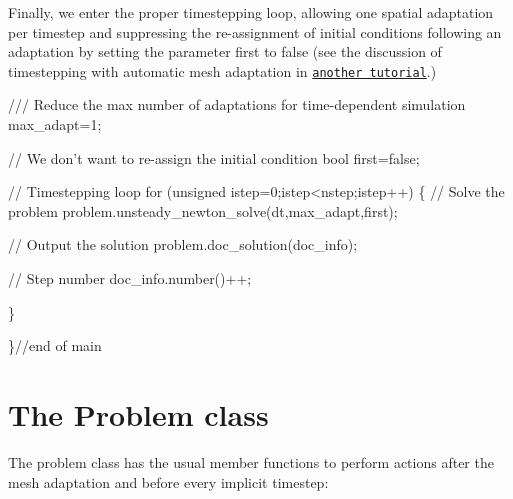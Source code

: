 Finally, we enter the proper timestepping loop, allowing one spatial adaptation per timestep and suppressing the re-\/assignment of initial conditions following an adaptation by setting the parameter {\ttfamily first} to false (see the discussion of timestepping with automatic mesh adaptation in \href{../../../unsteady_heat/two_d_unsteady_heat_adapt/html/index.html}{\tt another tutorial}.)


\begin{DoxyCodeInclude}

\textcolor{comment}{}
\textcolor{comment}{ /// Reduce the max number of adaptations for time-dependent simulation}
\textcolor{comment}{} max\_adapt=1;

 \textcolor{comment}{// We don't want to re-assign the initial condition }
 \textcolor{keywordtype}{bool} first=\textcolor{keyword}{false};
 
\textcolor{comment}{// Timestepping loop}
 \textcolor{keywordflow}{for} (\textcolor{keywordtype}{unsigned} istep=0;istep<nstep;istep++)
  \{ 
   \textcolor{comment}{// Solve the problem}
   problem.unsteady\_newton\_solve(dt,max\_adapt,first);
   
   \textcolor{comment}{// Output the solution}
   problem.doc\_solution(doc\_info);
   
   \textcolor{comment}{// Step number}
   doc\_info.number()++;

  \}


\}\textcolor{comment}{//end of main}

\end{DoxyCodeInclude}




 

\hypertarget{index_problem}{}\section{The Problem class}\label{index_problem}
The problem class has the usual member functions to perform actions after the mesh adaptation and before every implicit timestep\+:

